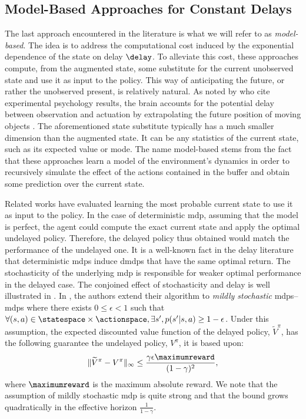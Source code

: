 \subsection{Model-Based Approaches for Constant Delays}
\label{subsec:model_based_related_works}
The last approach encountered in the literature is what we will refer to as \emph{model-based}.
The idea is to address the computational cost induced by the exponential dependence of the state on delay $\delay$. To alleviate this cost, these approaches compute, from the augmented state, some substitute for the current unobserved state and use it as input to the policy. 
This way of anticipating the future, or rather the unobserved present, is relatively natural. 
As noted by \cite{firoiu2018human} who cite experimental psychology results, the brain accounts for the potential delay between observation and actuation by extrapolating the future position of moving objects \cite{nijhawan1994motion}.
The aforementioned state substitute typically has a much smaller dimension than the augmented state.
It can be any statistics of the current state, such as its expected value or mode. 
The name model-based stems from the fact that these approaches learn a model of the environment's dynamics in order to recursively simulate the effect of the actions contained in the buffer and obtain some prediction over the current state.

Related works have evaluated learning the most probable current state \cite{walsh2009learning} to use it as input to the policy. In the case of deterministic \gls{mdp}, assuming that the model is perfect, the agent could compute the exact current state and apply the optimal undelayed policy. 
Therefore, the delayed policy thus obtained would match the performance of the undelayed one. 
It is a well-known fact in the delay literature that deterministic \glspl{mdp} induce \glspl{dmdp} that have the same optimal return. 
The stochasticity of the underlying \gls{mdp} is responsible for weaker optimal performance in the delayed case. 
The conjoined effect of stochasticity and delay is well illustrated in \cite[Remark 3.1]{derman2021acting}.
In \cite{walsh2009learning}, the authors extend their algorithm to \emph{mildly stochastic} \glspl{mdp}--\glspl{mdp} where there exists $0\le\epsilon<1$ such that $\forall (s,a)\in\statespace\times\actionspace, \exists s', p(s'\vert s,a)\geq 1-\epsilon$. 
Under this assumption, the expected discounted value function of the delayed policy, $\widetilde{V}^{\pi}$, has the following guarantee \wrt the undelayed policy, $V^{\pi}$, it is based upon: 
\begin{align*}
    \lVert \widetilde{V}^{\pi}-V^{\pi}\rVert_{\infty}\leq \frac{\gamma\epsilon \maximumreward}{(1-\gamma)^2},
\end{align*}
where $\maximumreward$ is the maximum absolute reward.
We note that the assumption of mildly stochastic \gls{mdp} is quite strong and that the bound grows quadratically in the effective horizon $\textstyle\frac{1}{1-\gamma}$.

